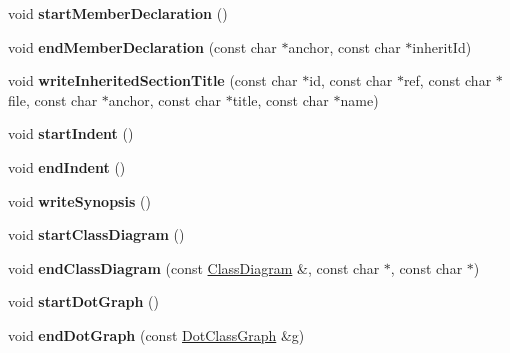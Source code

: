 \begin{DoxyCompactItemize}
\item 
\mbox{\label{class_docbook_generator_afab958dd26a75104df2c47501621beaf}} 
void {\bfseries start\+Member\+Declaration} ()
\item 
\mbox{\label{class_docbook_generator_afa825d6add13e2421f0e80114681abf8}} 
void {\bfseries end\+Member\+Declaration} (const char $\ast$anchor, const char $\ast$inherit\+Id)
\item 
\mbox{\label{class_docbook_generator_a5c07d2b117b266a1ca1b3492b6a72fba}} 
void {\bfseries write\+Inherited\+Section\+Title} (const char $\ast$id, const char $\ast$ref, const char $\ast$file, const char $\ast$anchor, const char $\ast$title, const char $\ast$name)
\item 
\mbox{\label{class_docbook_generator_a41f7e9ce5dde599cb53c50185fb9a9fa}} 
void {\bfseries start\+Indent} ()
\item 
\mbox{\label{class_docbook_generator_aa0dcc186dba954c875d34d2ec19221a9}} 
void {\bfseries end\+Indent} ()
\item 
\mbox{\label{class_docbook_generator_a4a81e9bb54de45c0691274ff93844bf4}} 
void {\bfseries write\+Synopsis} ()
\item 
\mbox{\label{class_docbook_generator_ad456aa2a144668eb1e8e0f56cbd092ea}} 
void {\bfseries start\+Class\+Diagram} ()
\item 
\mbox{\label{class_docbook_generator_a2663bce20e70dffbeef8ef9827b56de8}} 
void {\bfseries end\+Class\+Diagram} (const \mbox{\hyperlink{class_class_diagram}{Class\+Diagram}} \&, const char $\ast$, const char $\ast$)
\item 
\mbox{\label{class_docbook_generator_ac475d194e8d556cef4e092f1b3f8b5c6}} 
void {\bfseries start\+Dot\+Graph} ()
\item 
\mbox{\label{class_docbook_generator_ad237a9c056ae43d97ae98e34339809b5}} 
void {\bfseries end\+Dot\+Graph} (const \mbox{\hyperlink{class_dot_class_graph}{Dot\+Class\+Graph}} \&g)

\end{DoxyCompactItemize}
